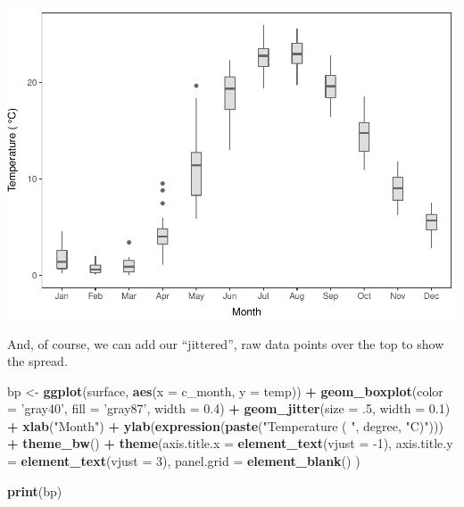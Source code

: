 \documentclass[
]{book}
\newenvironment{Shaded}{\begin{snugshade}}{\end{snugshade}}
\newcommand{\DataTypeTok}[1]{\textcolor[rgb]{0.13,0.29,0.53}{#1}}
\newcommand{\DecValTok}[1]{\textcolor[rgb]{0.00,0.00,0.81}{#1}}
\newcommand{\FloatTok}[1]{\textcolor[rgb]{0.00,0.00,0.81}{#1}}
\newcommand{\KeywordTok}[1]{\textcolor[rgb]{0.13,0.29,0.53}{\textbf{#1}}}
\newcommand{\NormalTok}[1]{#1}
\newcommand{\OperatorTok}[1]{\textcolor[rgb]{0.81,0.36,0.00}{\textbf{#1}}}
\newcommand{\StringTok}[1]{\textcolor[rgb]{0.31,0.60,0.02}{#1}}
\begin{document}
\includegraphics{worstr_files/figure-latex/unnamed-chunk-113-1.pdf}

And, of course, we can add our ``jittered'', raw data points over the top to show the spread.

\begin{Shaded}
\begin{Highlighting}[]
\NormalTok{bp <-}\StringTok{ }\KeywordTok{ggplot}\NormalTok{(surface, }\KeywordTok{aes}\NormalTok{(}\DataTypeTok{x =}\NormalTok{ c_month, }\DataTypeTok{y =}\NormalTok{ temp)) }\OperatorTok{+}
\StringTok{  }\KeywordTok{geom_boxplot}\NormalTok{(}\DataTypeTok{color =} \StringTok{'gray40'}\NormalTok{, }\DataTypeTok{fill =} \StringTok{'gray87'}\NormalTok{, }\DataTypeTok{width =} \FloatTok{0.4}\NormalTok{) }\OperatorTok{+}
\StringTok{  }\KeywordTok{geom_jitter}\NormalTok{(}\DataTypeTok{size =} \FloatTok{.5}\NormalTok{, }\DataTypeTok{width =} \FloatTok{0.1}\NormalTok{) }\OperatorTok{+}
\StringTok{  }\KeywordTok{xlab}\NormalTok{(}\StringTok{"Month"}\NormalTok{) }\OperatorTok{+}
\StringTok{  }\KeywordTok{ylab}\NormalTok{(}\KeywordTok{expression}\NormalTok{(}\KeywordTok{paste}\NormalTok{(}\StringTok{"Temperature ( "}\NormalTok{, degree, }\StringTok{"C)"}\NormalTok{))) }\OperatorTok{+}
\StringTok{  }\KeywordTok{theme_bw}\NormalTok{() }\OperatorTok{+}
\StringTok{  }\KeywordTok{theme}\NormalTok{(}\DataTypeTok{axis.title.x =} \KeywordTok{element_text}\NormalTok{(}\DataTypeTok{vjust =} \DecValTok{-1}\NormalTok{),}
        \DataTypeTok{axis.title.y =} \KeywordTok{element_text}\NormalTok{(}\DataTypeTok{vjust =} \DecValTok{3}\NormalTok{),}
        \DataTypeTok{panel.grid =} \KeywordTok{element_blank}\NormalTok{()}
\NormalTok{  )}

\KeywordTok{print}\NormalTok{(bp)}
\end{Highlighting}
\end{Shaded}
\end{document}
